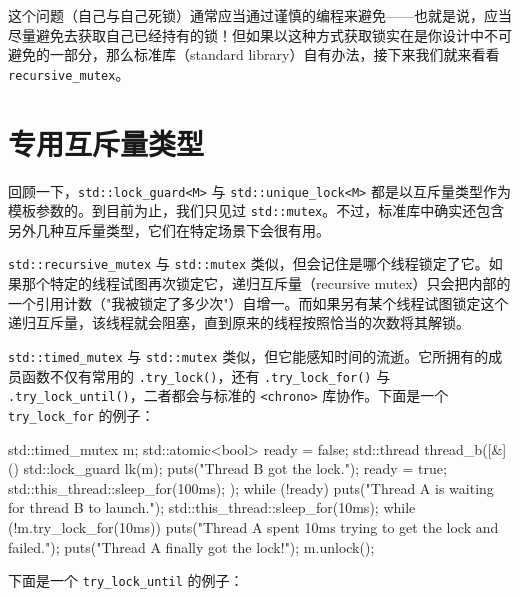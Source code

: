 这个问题（自己与自己死锁）通常应当通过谨慎的编程来避免——也就是说，应当尽量避免去获取自己已经持有的锁！但如果以这种方式获取锁实在是你设计中不可避免的一部分，那么标准库（standard library）自有办法，接下来我们就来看看 \texttt{recursive\_\allowbreak{}mutex}。

\section{专用互斥量类型}

回顾一下，\texttt{std::\allowbreak{}lock\_\allowbreak{}guard<\allowbreak{}M>\allowbreak{}} 与 \texttt{std::\allowbreak{}unique\_\allowbreak{}lock<\allowbreak{}M>\allowbreak{}} 都是以互斥量类型作为模板参数的。到目前为止，我们只见过 \texttt{std::\allowbreak{}mutex}。不过，标准库中确实还包含另外几种互斥量类型，它们在特定场景下会很有用。

\texttt{std::\allowbreak{}recursive\_\allowbreak{}mutex} 与 \texttt{std::\allowbreak{}mutex} 类似，但会记住是哪个线程锁定了它。如果那个特定的线程试图再次锁定它，递归互斥量（recursive mutex）只会把内部的一个引用计数（"我被锁定了多少次"）自增一。而如果另有某个线程试图锁定这个递归互斥量，该线程就会阻塞，直到原来的线程按照恰当的次数将其解锁。

\texttt{std::\allowbreak{}timed\_\allowbreak{}mutex} 与 \texttt{std::\allowbreak{}mutex} 类似，但它能感知时间的流逝。它所拥有的成员函数不仅有常用的 \texttt{.try\_\allowbreak{}lock(\allowbreak{})\allowbreak{}}，还有 \texttt{.try\_\allowbreak{}lock\_\allowbreak{}for(\allowbreak{})\allowbreak{}} 与 \texttt{.try\_\allowbreak{}lock\_\allowbreak{}until(\allowbreak{})\allowbreak{}}，二者都会与标准的 \texttt{<chrono>\allowbreak{}} 库协作。下面是一个 \texttt{try\_\allowbreak{}lock\_\allowbreak{}for} 的例子：

\begin{codebox}[cpp]
    std::timed_mutex m;
    std::atomic<bool> ready = false;
    std::thread thread_b([&]() {
      std::lock_guard lk(m);
      puts("Thread B got the lock.");
      ready = true;
      std::this_thread::sleep_for(100ms);
    });
    while (!ready) {
      puts("Thread A is waiting for thread B to launch.");
      std::this_thread::sleep_for(10ms);
    }
    while (!m.try_lock_for(10ms)) {
      puts("Thread A spent 10ms trying to get the lock and failed.");
    }
    puts("Thread A finally got the lock!");
    m.unlock();
\end{codebox}

下面是一个 \texttt{try\_\allowbreak{}lock\_\allowbreak{}until} 的例子：

